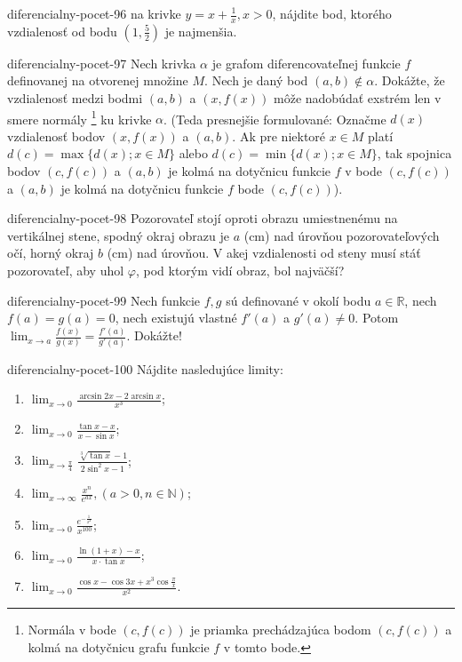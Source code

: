 \begin{defproblem}{diferencialny-pocet-96}
na krivke $y=x+\frac{1}{x},x>0$, nájdite bod, ktorého vzdialenosť od bodu $(1,\frac{5}{2})$ je najmenšia.
\end{defproblem}

\begin{defproblem}{diferencialny-pocet-97}
Nech krivka $\alpha$ je grafom diferencovateľnej funkcie $f$ definovanej na otvorenej množine $M$. Nech je daný bod $(a,b)\notin \alpha$. Dokážte, že vzdialenosť medzi bodmi $(a,b)$ a $(x,f(x))$ môže nadobúdať exstrém len v smere normály \footnote{Normála v bode $(c,f(c))$ je priamka prechádzajúca bodom $(c,f(c))$ a kolmá na dotyčnicu grafu funkcie $f$ v tomto bode.} ku krivke $\alpha$. (Teda presnejšie formulované: Označme $d(x)$ vzdialenosť bodov $(x,f(x))$ a $(a,b)$. Ak pre niektoré $x\in M$ platí $d(c)=\max \{d(x);x\in M\}$ alebo $d(c)=\min \{d(x);x\in M\}$, tak spojnica bodov $(c,f(c))$ a $(a,b)$ je kolmá na dotyčnicu funkcie $f$ v bode $(c,f(c))$ a $(a,b)$ je kolmá na dotyčnicu funkcie $f$  bode $(c,f(c))$).
\end{defproblem}

\begin{defproblem}{diferencialny-pocet-98}
Pozorovateľ stojí oproti obrazu umiestnenému na vertikálnej stene, spodný okraj obrazu je $a$ (cm) nad úrovňou pozorovateľových očí, horný okraj $b$ (cm) nad úrovňou. V akej vzdialenosti od steny musí stáť pozorovateľ, aby uhol $\varphi$, pod ktorým vidí obraz, bol najväčší?
\end{defproblem}

\begin{defproblem}{diferencialny-pocet-99}
Nech funkcie $f,g$ sú definované v okolí bodu $a\in\mathbb{R}$, nech $f(a)=g(a)=0$, nech existujú vlastné $f'(a)$ a $g'(a)\neq 0$. Potom $\lim_{x\rightarrow a}\frac{f(x)}{g(x)}=\frac{f'(a)}{g'(a)}$. Dokážte!
\end{defproblem}

\begin{defproblem}{diferencialny-pocet-100}
Nájdite nasledujúce limity:
\begin{multicols}{2}
\begin{enumerate}
    \item $\lim_{x\rightarrow 0}\frac{\arcsin 2x-2\arcsin x}{x^3}$;
	\item $\lim_{x\rightarrow 0}\frac{\tan x-x}{x-\sin x}$;
	\item $\lim_{x\rightarrow \frac{\pi}{4}}\frac{\sqrt[3]{\tan x}-1}{2\sin^2 x -1}$;
	\item $\lim_{x\rightarrow\infty}\frac{x^n}{e^{ax}},(a>0,n\in\mathbb{N})$;
	\item $\lim_{x\rightarrow 0}\frac{e^{-\frac{1}{x^2}}}{x^{100}}$;
	\item $\lim_{x\rightarrow 0}\frac{\ln (1+x)-x}{x\cdot\tan x}$;
	\item $\lim_{x\rightarrow 0}\frac{\cos x-\cos 3x+x^3\cos \frac{\pi}{x}}{x^2}$.
\end{enumerate}
\end{multicols}
\end{defproblem}

